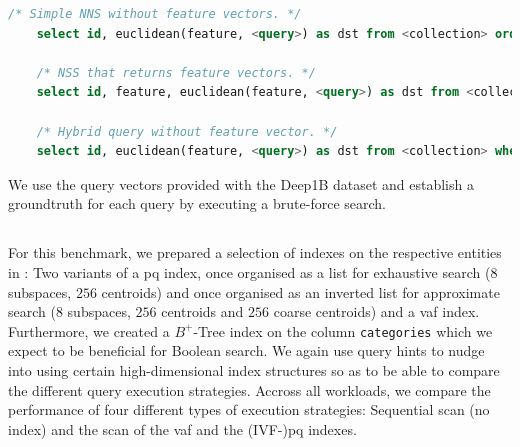 \begin{lstlisting}[language=SQL, caption={Pseudo-SQL of the queries executed for this measurement.}, label=listing:big_nns_query, numbers=none]
    /* Simple NNS without feature vectors. */
    select id, euclidean(feature, <query>) as dst from <collection> order by dst limit 1000
    
    /* NSS that returns feature vectors. */
    select id, feature, euclidean(feature, <query>) as dst from <collection> order by dst limit 1000

    /* Hybrid query without feature vector. */
    select id, euclidean(feature, <query>) as dst from <collection> where category = <category> order by dst limit 1000
\end{lstlisting}

We use the query vectors provided with the Deep1B dataset and establish a groundtruth for each query by executing a brute-force search.

\subsection{\cottontail}
\label{section:evaluation_bignns_cottontail}
For this benchmark, we prepared a selection of indexes on the respective entities in \cottontail{}: Two variants of a \acrshort{pq} index, once organised as a list for exhaustive search ($8$ subspaces, $256$ centroids) and once organised as an inverted list for approximate search ($8$ subspaces, $256$ centroids and $256$ coarse centroids) and a \acrshort{vaf} index. Furthermore, we created a $B^{+}$-Tree index on the column \texttt{categories} which we expect to be beneficial for Boolean search. We again use query hints to nudge \cottontail{} into using certain high-dimensional index structures so as to be able to compare the different query execution strategies. Accross all workloads, we compare the performance of four different types of execution strategies: Sequential scan (no index) and the scan of the \acrshort{vaf} and the (IVF-)\acrshort{pq} indexes.

